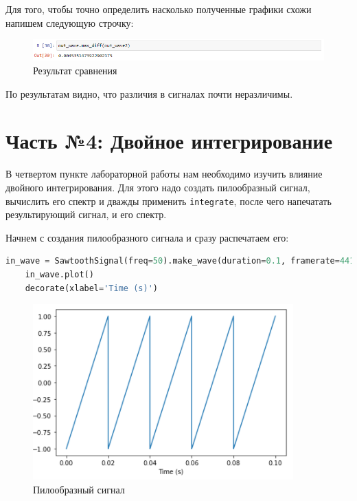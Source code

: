 \documentclass[a4paper]{article}
\begin{document}
            Для того, чтобы точно определить насколько полученные графики схожи напишем следующую строчку:

            \begin{figure}[H]
                \centering
                \includegraphics[width=\textwidth]{ex_3_5.png}
                \caption{Результат сравнения}
                \label{fig:ex_3_5}
            \end{figure}
            
            По результатам видно, что различия в сигналах почти неразличимы.
            
    \newpage
        \section{Часть №4: Двойное интегрирование}
            В четвертом пункте лабораторной работы нам необходимо изучить влияние двойного интегрирования. Для этого надо создать пилообразный сигнал, вычислить его спектр и дважды применить \texttt{integrate}, после чего напечатать результирующий сигнал, и его спектр.
            
            Начнем с создания пилообразного сигнала и сразу распечатаем его:
            
\begin{lstlisting}[language=Python, caption= Создание и вывод пилообразнного сигнала]
    in_wave = SawtoothSignal(freq=50).make_wave(duration=0.1, framerate=44100)
    in_wave.plot()
    decorate(xlabel='Time (s)')
\end{lstlisting}
            
            \begin{figure}[H]
                \centering
                \includegraphics{ex_4_1.png}
                \caption{Пилообразный сигнал}
                \label{fig:ex_4_1}
            \end{figure}
            
\end{document}

